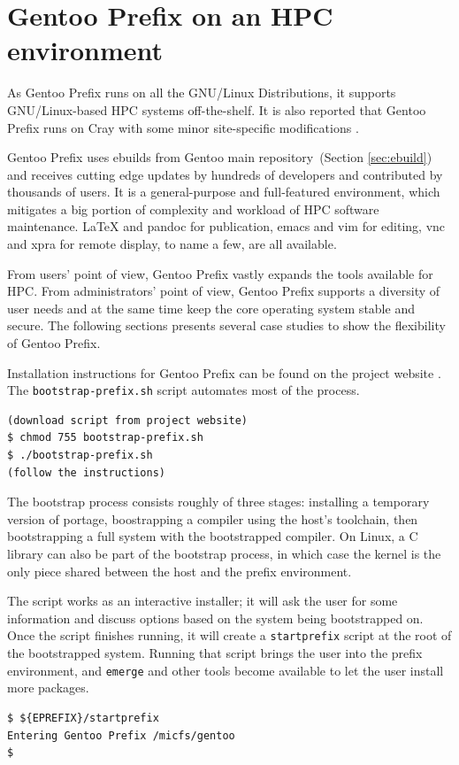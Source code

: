 \documentclass[a4paper,conference]{IEEEtran}
\begin{document}

\section{Gentoo Prefix on an HPC environment}
As Gentoo Prefix runs on all the GNU/Linux Distributions, it supports
GNU/Linux-based HPC systems off-the-shelf.  It is also reported that
Gentoo Prefix runs on Cray with some minor site-specific modifications
\cite{cray}.

Gentoo Prefix uses ebuilds from Gentoo main repository~(Section
\ref{sec:ebuild}) and receives cutting edge updates by hundreds of
developers and contributed by thousands of users.  It is a
general-purpose and full-featured environment, which mitigates a big
portion of complexity and workload of HPC software
maintenance. \LaTeX{} and pandoc for publication, emacs and vim for
editing, vnc and xpra for remote display, to name a few, are all
available.

From users' point of view, Gentoo Prefix vastly expands the tools
available for HPC.  From administrators' point of view, Gentoo Prefix
supports a diversity of user needs and at the same time keep the core
operating system stable and secure. The following sections presents
several case studies to show the flexibility of Gentoo Prefix.


Installation instructions for Gentoo Prefix can be found on the project
website \cite{gentoo:prefix}. The \texttt{bootstrap-prefix.sh} script
automates most of the process.
\begin{verbatim}
(download script from project website)
$ chmod 755 bootstrap-prefix.sh
$ ./bootstrap-prefix.sh
(follow the instructions)
\end{verbatim}

The bootstrap process consists roughly of three stages: installing a
temporary version of portage, boostrapping a compiler using the host's
toolchain, then bootstrapping a full system with the bootstrapped
compiler. On Linux, a C library can also be part of the bootstrap
process, in which case the kernel is the only piece shared between the
host and the prefix environment.

The script works as an interactive installer; it will ask the user for
some information and discuss options based on the system being
bootstrapped on. Once the script finishes running, it will create a
\texttt{startprefix} script at the root of the bootstrapped system.
Running that script brings the user into the prefix environment, and
\texttt{emerge} and other tools become available to let the user install
more packages.
\begin{verbatim}
$ ${EPREFIX}/startprefix
Entering Gentoo Prefix /micfs/gentoo
$
\end{verbatim}
\end{document}
